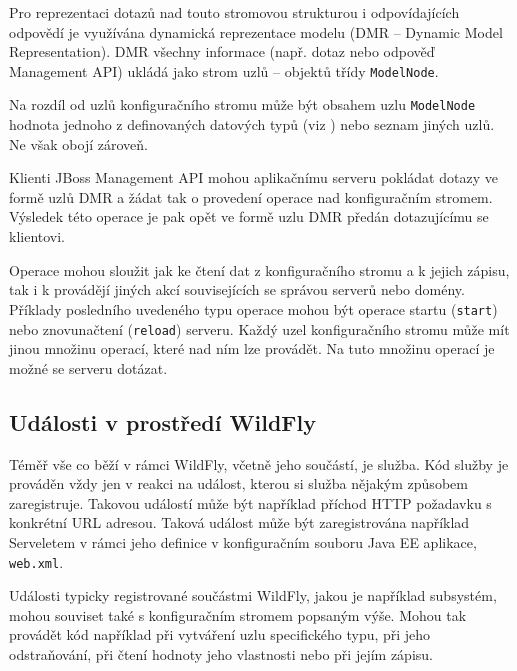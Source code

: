 Pro reprezentaci dotazů nad touto stromovou strukturou i odpovídajících odpovědí je využívána dynamická reprezentace modelu (DMR -- Dynamic Model Representation).
DMR všechny informace (např. dotaz nebo odpověď Management API) ukládá jako strom uzlů -- objektů třídy {\tt ModelNode}.
\cite{jbossDetypedManagement}

Na rozdíl od uzlů konfiguračního stromu může být obsahem uzlu {\tt ModelNode} hodnota jednoho z definovaných datových typů (viz \cite{jboss7slideShare}) nebo seznam jiných uzlů. Ne však obojí zároveň.
\cite{jboss7slideShare}

Klienti JBoss Management API mohou aplikačnímu serveru pokládat dotazy ve formě uzlů DMR a žádat tak o provedení operace nad konfiguračním stromem.
Výsledek této operace je pak opět ve formě uzlu DMR předán dotazujícímu se klientovi.
\cite{jbossDetypedManagement}

Operace mohou sloužit jak ke čtení dat z konfiguračního stromu a k jejich zápisu, tak i k provádějí jiných akcí souvisejících se správou serverů nebo domény.
Příklady posledního uvedeného typu operace mohou být operace startu ({\tt start}) nebo znovunačtení ({\tt reload}) serveru.
Každý uzel konfiguračního stromu může mít jinou množinu operací, které nad ním lze provádět.
Na tuto množinu operací je možné se serveru dotázat.
\cite{jbossDetypedManagement}

\subsection{Události v prostředí WildFly} \label{udalostiWildFly}

Téměř vše co běží v rámci WildFly, včetně jeho součástí, je služba.
Kód služby je prováděn vždy jen v reakci na událost, kterou si služba nějakým způsobem zaregistruje.
Takovou událostí může být například příchod HTTP požadavku s konkrétní URL adresou.
Taková událost může být zaregistrována například Serveletem v rámci jeho definice v konfiguračním souboru Java EE aplikace, {\tt web.xml}.
\cite{jboss7slideShare}

Události typicky registrované součástmi WildFly, jakou je například subsystém, mohou souviset také s konfiguračním stromem popsaným výše.
Mohou tak provádět kód například při vytváření uzlu specifického typu, při jeho odstraňování, při čtení hodnoty jeho vlastnosti nebo při jejím zápisu.
\cite{WildFlyExtending}

